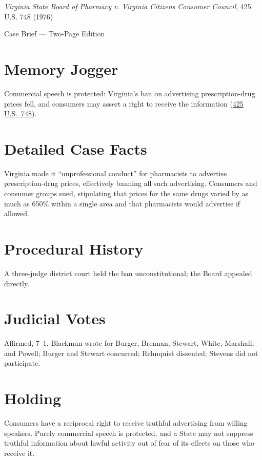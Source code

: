 \documentclass[12pt]{article}
\begin{document}
\begin{center}
{\LARGE \textit{Virginia State Board of Pharmacy v. Virginia Citizens Consumer Council}, 425 U.S. 748 (1976)\par}
\vspace{0.5em}
{\large Case Brief --- Two-Page Edition\par}
\end{center}

\section{Memory Jogger}
Commercial speech is protected: Virginia's ban on advertising prescription-drug prices fell, and consumers may assert a right to receive the information (\href{https://supreme.justia.com/cases/federal/us/425/748/}{425 U.S.\ 748}).

\section{Detailed Case Facts}
Virginia made it ``unprofessional conduct'' for pharmacists to advertise prescription-drug prices, effectively banning all such advertising. Consumers and consumer groups sued, stipulating that prices for the same drugs varied by as much as 650\% within a single area and that pharmacists would advertise if allowed.

\section{Procedural History}
A three-judge district court held the ban unconstitutional; the Board appealed directly.

\section{Judicial Votes}
Affirmed, 7--1. Blackmun wrote for Burger, Brennan, Stewart, White, Marshall, and Powell; Burger and Stewart concurred; Rehnquist dissented; Stevens did not participate.

\section{Holding}
Consumers have a reciprocal right to receive truthful advertising from willing speakers. Purely commercial speech is protected, and a State may not suppress truthful information about lawful activity out of fear of its effects on those who receive it.
\end{document}
